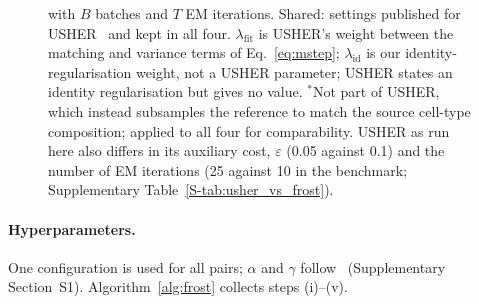 \begin{figure}[t]
{with $B$ batches and $T$ EM iterations. Shared: settings published for USHER~\citep{pratapa2025usher} and kept in all
four. $\lambda_{\mathrm{fit}}$ is USHER's weight between the matching and variance terms of Eq.~\eqref{eq:mstep};
$\lambda_{\mathrm{id}}$ is our identity-regularisation weight, not a USHER parameter; USHER states an identity regularisation but gives no value. $^{\ast}$Not part of USHER, which
instead subsamples the reference to match the source cell-type composition; applied to all four for comparability.
USHER as run here also differs in its auxiliary cost, $\varepsilon$ (0.05 against 0.1) and the number of EM
iterations (25 against 10 in the benchmark; Supplementary Table~\ref{S-tab:usher_vs_frost}).}
\label{fig:variants}
\end{figure}

\paragraph{Hyperparameters.} One configuration is used for all pairs; $\alpha$ and $\gamma$ follow~\citep{pratapa2025usher}
(Supplementary Section~S1). Algorithm~\ref{alg:frost} collects steps (i)--(v).

